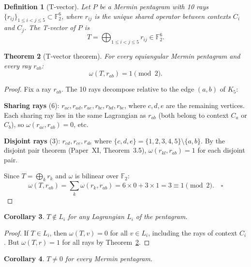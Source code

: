 \documentclass[11pt,a4paper]{article}
\newtheorem{theorem}{Theorem}[section]
\newtheorem{corollary}[theorem]{Corollary}
\newtheorem{definition}[theorem]{Definition}
\theoremstyle{remark}
\newcommand{\F}{\mathbb{F}}
\begin{document}
\begin{definition}[T-vector]
\label{def:T}
Let $P$ be a Mermin pentagram with 10 rays
$\{r_{ij}\}_{1 \leq i < j \leq 5} \subset \F_2^6$, where $r_{ij}$ is
the unique shared operator between contexts $C_i$ and $C_j$. The
\emph{T-vector} of $P$ is
\[
  T = \bigoplus_{1 \leq i < j \leq 5} r_{ij} \in \F_2^6.
\]
\end{definition}

\begin{theorem}[T-vector theorem]
\label{thm:T-vector}
For every equiangular Mermin pentagram and every ray $r_{ab}$:
\[
  \omega(T, r_{ab}) = 1 \pmod{2}.
\]
\end{theorem}

\begin{proof}
Fix a ray $r_{ab}$. The 10 rays decompose relative to the edge $(a,b)$
of $K_5$:

\medskip

\textbf{Sharing rays} (6): $r_{ac}, r_{ad}, r_{ae}, r_{bc}, r_{bd},
r_{be}$, where $c, d, e$ are the remaining vertices. Each sharing ray
lies in the same Lagrangian as $r_{ab}$ (both belong to context $C_a$
or $C_b$), so $\omega(r_{ac}, r_{ab}) = 0$, etc.

\medskip

\textbf{Disjoint rays} (3): $r_{cd}, r_{ce}, r_{de}$ where
$\{c,d,e\} = \{1,2,3,4,5\} \setminus \{a,b\}$. By the disjoint pair
theorem (Paper~XI, Theorem~3.5), $\omega(r_{kl}, r_{ab}) = 1$ for
each disjoint pair.

\medskip

Since $T = \bigoplus_k r_k$ and $\omega$ is bilinear over $\F_2$:
\[
  \omega(T, r_{ab})
  = \sum_{k} \omega(r_k, r_{ab})
  = 6 \times 0 + 3 \times 1
  = 3 \equiv 1 \pmod{2}. \quad \square
\]
\end{proof}

\begin{corollary}
\label{cor:T-not-in-L}
$T \notin L_i$ for any Lagrangian $L_i$ of the pentagram.
\end{corollary}

\begin{proof}
If $T \in L_i$, then $\omega(T, v) = 0$ for all $v \in L_i$, including
the rays of context $C_i$. But $\omega(T, r) = 1$ for all rays by
Theorem~\ref{thm:T-vector}.
\end{proof}

\begin{corollary}
\label{cor:T-nonzero}
$T \neq 0$ for every Mermin pentagram.
\end{corollary}
\end{document}
